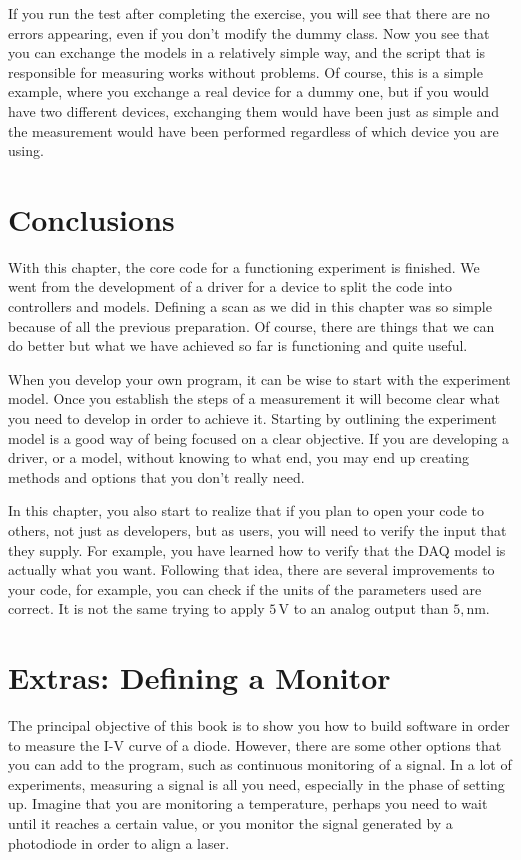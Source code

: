 
If you run the test after completing the exercise, you will see that there are no errors appearing, even if you don't modify the dummy class. Now you see that you can exchange the models in a relatively simple way, and the script that is responsible for measuring works without problems. Of course, this is a simple example, where you exchange a real device for a dummy one, but if you would have two different devices, exchanging them would have been just as simple and the measurement would have been performed regardless of which device you are using.


\section{Conclusions}\label{experiment-model-conclusions}
With this chapter, the core code for a functioning experiment is finished. We went from the development of a driver for a device to split the code into controllers and models. Defining a scan as we did in this chapter was so simple because of all the previous preparation. Of course, there are things that we can do better but what we have achieved so far is functioning and quite useful.

When you develop your own program, it can be wise to start with the experiment model. Once you establish the steps of a measurement it will become clear what you need to develop in order to achieve it. Starting by outlining the experiment model is a good way of being focused on a clear objective. If you are developing a driver, or a model, without knowing to what end, you may end up creating methods and options that you don't really need.

In this chapter, you also start to realize that if you plan to open your code to others, not just as developers, but as users, you will need to verify the input that they supply. For example, you have learned how to verify that the {DAQ} model is actually what you want. Following that idea, there are several improvements to your code, for example, you can check if the units of the parameters used are correct. It is not the same trying to apply $5\,\textrm{V}$ to an analog output than $5,\textrm{nm}$. 

\section{Extras: Defining a Monitor}\label{extras-defining-amonitor}
The principal objective of this book is to show you how to build software in order to measure the I-V curve of a diode. However, there are some other options that you can add to the program, such as continuous monitoring of a signal. In a lot of experiments, measuring a signal is all you need, especially in the phase of setting up. Imagine that you are monitoring a temperature, perhaps you need to wait until it reaches a certain value, or you monitor the signal generated by a photodiode in order to align a laser.

